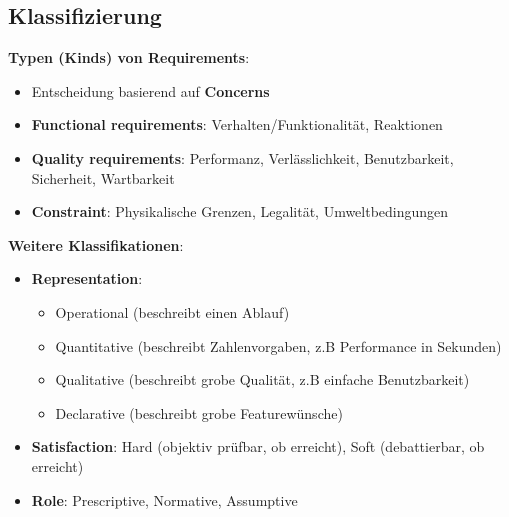 \subsection{Klassifizierung}
\label{rq:sub:klassifizierung}

\textbf{Typen (Kinds) von Requirements}:
\begin{itemize}
	\item Entscheidung basierend auf \textbf{Concerns}
	\item \textbf{Functional requirements}: Verhalten/Funktionalität, Reaktionen
	\item \textbf{Quality requirements}: Performanz, Verlässlichkeit, Benutzbarkeit, Sicherheit, Wartbarkeit
	\item \textbf{Constraint}: Physikalische Grenzen, Legalität, Umweltbedingungen
\end{itemize}
\textbf{Weitere Klassifikationen}:
\begin{itemize}
	\item \textbf{Representation}:
	\begin{itemize}
		\item Operational (beschreibt einen Ablauf)
		\item Quantitative (beschreibt Zahlenvorgaben, z.B Performance in Sekunden)
		\item Qualitative (beschreibt grobe Qualität, z.B einfache Benutzbarkeit)
		\item Declarative (beschreibt grobe Featurewünsche)
	\end{itemize}
	\item \textbf{Satisfaction}: Hard (objektiv prüfbar, ob erreicht), Soft (debattierbar, ob erreicht)
	\item \textbf{Role}: Prescriptive, Normative, Assumptive
\end{itemize}